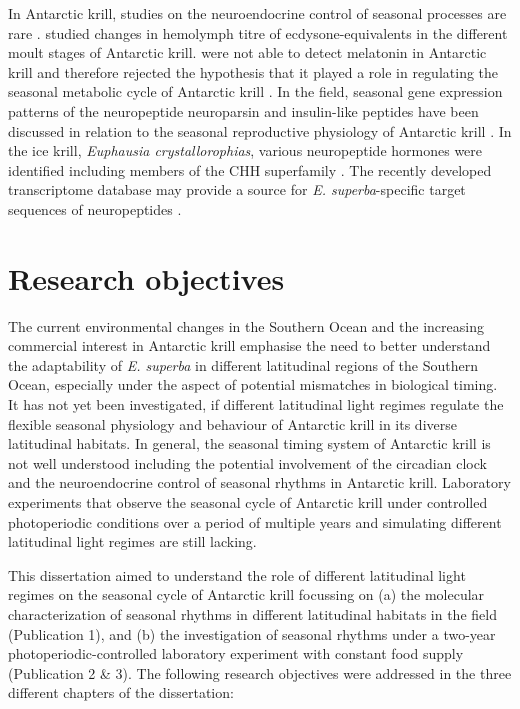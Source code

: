 In Antarctic krill, studies on the neuroendocrine control of seasonal processes
are rare \citep{bucht_isolation_1991, pape_melatonin_2008, seear_seasonal_2012, toullec_transcriptome_2013}. \citet{bucht_isolation_1991} studied changes in hemolymph titre of
ecdysone-equivalents in the different moult stages of Antarctic krill. \citet{pape_melatonin_2008} were not able to detect melatonin in Antarctic krill and therefore
rejected the hypothesis that it played a role in regulating the seasonal
metabolic cycle of Antarctic krill \citep{teschke_simulated_2007}.  In the field,
seasonal gene expression patterns of the neuropeptide neuroparsin and
insulin-like peptides have been discussed in relation to the seasonal
reproductive physiology of Antarctic krill \citep{seear_seasonal_2012}. In the ice
krill, \textit{Euphausia crystallorophias}, various neuropeptide hormones were
identified including members of the CHH superfamily \citep{toullec_transcriptome_2013}. The
recently developed transcriptome database may provide a source for \textit{E.
superba}-specific target sequences of neuropeptides \citep{sales_krilldb:_2017}.

\section{Research objectives}
The current environmental changes in the Southern Ocean and the increasing
commercial interest in Antarctic krill emphasise the need to better understand
the adaptability of \textit{E. superba} in different latitudinal regions of the
Southern Ocean, especially under the aspect of potential mismatches in
biological timing. It has not yet been investigated, if different latitudinal
light regimes regulate the flexible seasonal physiology and behaviour of
Antarctic krill in its diverse latitudinal habitats.  In general, the seasonal
timing system of Antarctic krill is not well understood including the potential
involvement of the circadian clock and the neuroendocrine control of seasonal
rhythms in Antarctic krill. Laboratory experiments that observe the seasonal
cycle of Antarctic krill under controlled photoperiodic conditions over a
period of multiple years and simulating different latitudinal light regimes are
still lacking.

This dissertation aimed to understand the role of different latitudinal light
regimes on the seasonal cycle of Antarctic krill focussing on (a) the molecular
characterization of seasonal rhythms in different latitudinal habitats in the
field (Publication 1), and (b) the investigation of seasonal rhythms under a
two-year photoperiodic-controlled laboratory experiment with constant food
supply (Publication 2 \& 3). The following research objectives were addressed
in the three different chapters of the dissertation:

